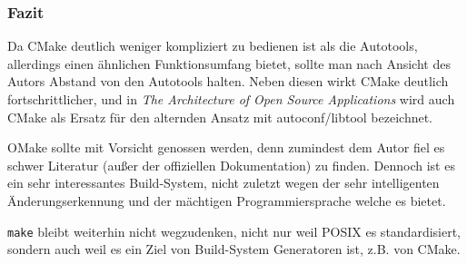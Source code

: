 \clearpage
\subsubsection*{Fazit}
%
Da CMake deutlich weniger kompliziert zu bedienen ist als die Autotools,
allerdings einen ähnlichen Funktionsumfang bietet, sollte man nach Ansicht des
Autors Abstand von den Autotools halten. Neben diesen wirkt CMake deutlich
fortschrittlicher, und in \textit{The Architecture of Open Source Applications}
 wird auch CMake als Ersatz für den alternden Ansatz mit
autoconf/libtool bezeichnet.

OMake sollte mit Vorsicht genossen werden, denn zumindest dem Autor fiel es
schwer Literatur (außer der offiziellen Dokumentation) zu finden. Dennoch ist es
ein sehr interessantes Build-System, nicht zuletzt wegen der sehr intelligenten
Änderungserkennung und der mächtigen Programmiersprache welche es bietet.

\texttt{make} bleibt weiterhin nicht wegzudenken, nicht nur weil POSIX es
standardisiert, sondern auch weil es ein Ziel von Build-System Generatoren ist,
z.B. von CMake.
